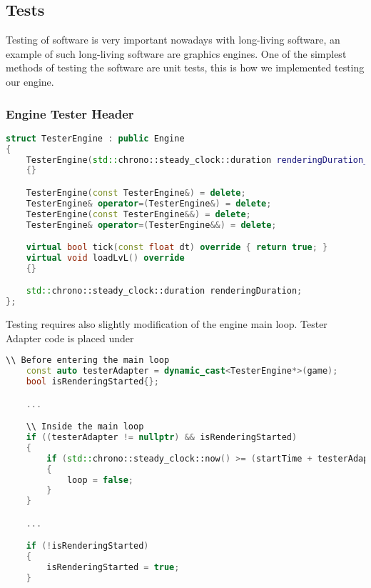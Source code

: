\newpage

\subsection{Tests}
Testing of software is very important nowadays with long-living software, an example of such long-living software are graphics engines.
One of the simplest methods of testing the software are unit tests, this is how we implemented testing our engine.

\subsubsection{Engine Tester Header}
\begin{lstlisting}[language=c++, caption=Tester Engine class (./engine/tests/tester.cpp)]
struct TesterEngine : public Engine
{
    TesterEngine(std::chrono::steady_clock::duration renderingDuration_) : renderingDuration{renderingDuration_}
    {}

    TesterEngine(const TesterEngine&) = delete;
    TesterEngine& operator=(TesterEngine&) = delete;
    TesterEngine(const TesterEngine&&) = delete;
    TesterEngine& operator=(TesterEngine&&) = delete;

    virtual bool tick(const float dt) override { return true; }
    virtual void loadLvL() override
    {}

    std::chrono::steady_clock::duration renderingDuration;
};
\end{lstlisting}

Testing requires also slightly modification of the engine main loop. Tester Adapter code is placed under \texttt{}
\begin{lstlisting}[language=c++, caption=Tester related code inside Engine Main Loop (./engine/tests/tester.cpp)]
    \\ Before entering the main loop
    const auto testerAdapter = dynamic_cast<TesterEngine*>(game);
    bool isRenderingStarted{};

    ...

    \\ Inside the main loop
    if ((testerAdapter != nullptr) && isRenderingStarted)
    {
        if (std::chrono::steady_clock::now() >= (startTime + testerAdapter->renderingDuration))
        {
            loop = false;
        }
    }

    ...

    if (!isRenderingStarted)
    {
        isRenderingStarted = true;
    }
\end{lstlisting}

